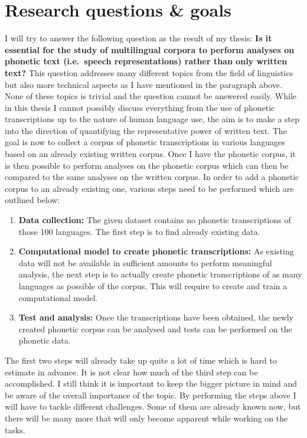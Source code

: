 \section{Research questions \& goals}
I will try to answer the following question as the result of my thesis: \textbf{Is it essential for the study of multilingual corpora to perform analyses on phonetic text (i.e.\ speech representations) rather than only written text?} This question addresses many different topics from the field of linguistics but also more technical aspects as I have mentioned in the paragraph above. None of these topics is trivial and the question cannot be answered easily. While in this thesis I cannot possibly discuss everything from the use of phonetic transcriptions up to the nature of human language use, the aim is to make a step into the direction of quantifying the representative power of written text. The goal is now to collect a corpus of phonetic transcriptions in various languages based on an already existing written corpus. Once I have the phonetic corpus, it is then possible to perform analyses on the phonetic corpus which can then be compared to the same analyses on the written corpus. In order to add a phonetic corpus to an already existing one, various steps need to be performed which are outlined below:
\begin{enumerate}
 \item \textbf{Data collection:} The given dataset contains no phonetic transcriptions of those 100 languages. The first step is to find already existing data. 
 \item \textbf{Computational model to create phonetic transcriptions:} As existing data will not be available in sufficient amounts to perform meaningful analysis, the next step is to actually create phonetic transcriptions of as many languages as possible of the corpus. This will require to create and train a computational model.
 \item \textbf{Test and analysis:} Once the transcriptions have been obtained, the newly created phonetic corpus can be analysed and tests can be performed on the phonetic data.
\end{enumerate}

The first two steps will already take up quite a lot of time which is hard to estimate in advance. It is not clear how much of the third step can be accomplished. I still think it is important to keep the bigger picture in mind and be aware of the overall importance of the topic. By performing the steps above I will have to tackle different challenges. Some of them are already known now, but there will be many more that will only become apparent while working on the tasks. 

